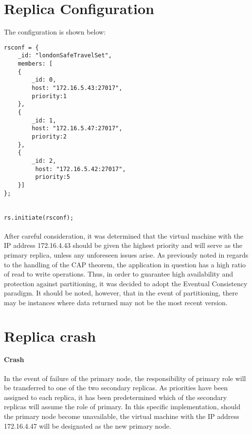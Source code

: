 \section{Replica Configuration}
The configuration is shown below:

\begin{lstlisting}
rsconf = {
	_id: "londonSafeTravelSet",
	members: [
	{
		_id: 0,
	 	host: "172.16.5.43:27017",
	 	priority:1
 	},
	{
		_id: 1,
	 	host: "172.16.5.47:27017",
	  	priority:2
  	},
	{
		_id: 2,
		 host: "172.16.5.42:27017",
		 priority:5
	}]
};


rs.initiate(rsconf);
\end{lstlisting}

\paragraph{}
After careful consideration, it was determined that the virtual machine with the IP address 172.16.4.43 should be given the highest priority and will serve as the primary replica, unless any unforeseen issues arise. As previously noted in regards to the handling of the CAP theorem, the application in question has a high ratio of read to write operations. Thus, in order to guarantee high availability and protection against partitioning, it was decided to adopt the Eventual Consistency paradigm. It should be noted, however, that in the event of partitioning, there may be instances where data returned may not be the most recent version.

\section{Replica crash}

\paragraph{Crash}In the event of failure of the primary node, the responsibility of primary role will be transferred to one of the two secondary replicas. As priorities have been assigned to each replica, it has been predetermined which of the secondary replicas will assume the role of primary. In this specific implementation, should the primary node become unavailable, the virtual machine with the IP address 172.16.4.47 will be designated as the new primary node. 
